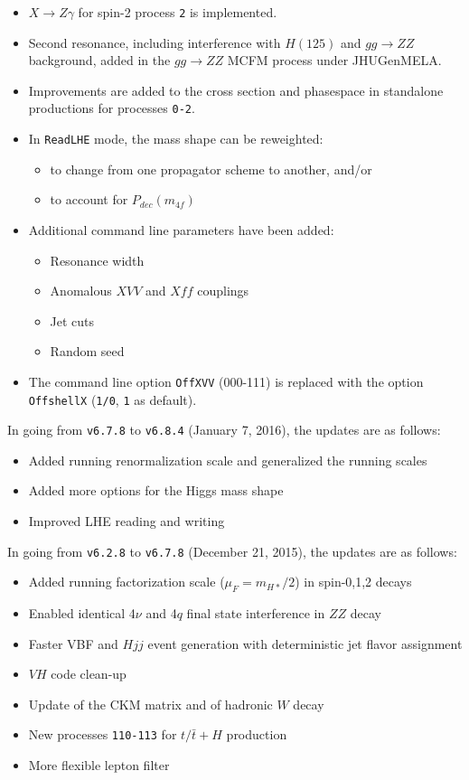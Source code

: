 \documentclass[aps,superscriptaddress,nofootinbib]{revtex4}
\begin{document}
\begin{itemize}
\item $X\to Z\gamma$ for spin-2 process \verb|2| is implemented.
\item Second resonance, including interference with $H(125)$ and $gg\to ZZ$ background, added in the $gg\to ZZ$ MCFM process under JHUGenMELA.
\item Improvements are added to the cross section and phasespace in standalone productions for processes \verb|0-2|.
\item In \verb|ReadLHE| mode, the mass shape can be reweighted:
\begin{itemize}
\item to change from one propagator scheme to another, and/or
\item to account for $P_{dec}(m_{4f})$
\end{itemize}
\item Additional command line parameters have been added:
\begin{itemize}
\item Resonance width
\item Anomalous $XVV$ and $Xff$ couplings
\item Jet cuts
\item Random seed
\end{itemize}
\item The command line option \verb|OffXVV| (000-111) is replaced with the option \verb|OffshellX| (\verb|1/0|, \verb|1| as default).
\end{itemize}
\noindent
In going from \verb|v6.7.8| to \verb|v6.8.4| (January 7, 2016), the updates are as follows:
\begin{itemize}
\item Added running renormalization scale and generalized the running scales
\item Added more options for the Higgs mass shape
\item Improved LHE reading and writing
\end{itemize}
\noindent
In going from \verb|v6.2.8| to \verb|v6.7.8| (December 21, 2015), the updates are as follows:
\begin{itemize}
\item Added running factorization scale ($\mu_F=m_{H*}/2$) in spin-0,1,2 decays
\item Enabled identical 4$\nu$ and 4$q$ final state interference in $ZZ$ decay
\item Faster VBF and $Hjj$ event generation with deterministic jet flavor assignment
\item $VH$ code clean-up
\item Update of the CKM matrix and of hadronic $W$ decay
\item New processes \verb|110-113| for $t/\bar{t}+H$ production
\item More flexible lepton filter
\end{itemize}
\end{document}
